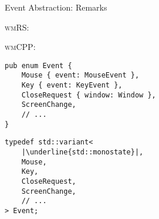 \begin{frame}[fragile]{Event Abstraction: Remarks \hfill {\footnotesize \currentname}}

\begin{minipage}[t]{.64\linewidth}
\textsc{wmRS}:\\[3pt]
\end{minipage}%
\begin{minipage}[t]{.36\linewidth}
\textsc{wmCPP}:\\[3pt]
\end{minipage}

\pause

\vspace*{8pt}\begin{minipage}[t]{.64\linewidth}
\begin{verbatim}
pub enum Event {
    Mouse { event: MouseEvent },
    Key { event: KeyEvent },
    CloseRequest { window: Window },
    ScreenChange,
    // ...
}
\end{verbatim}
\end{minipage}%
\begin{minipage}[t]{.36\linewidth}
\begin{verbatim}
typedef std::variant<
    |\underline{std::monostate}|,
    Mouse,
    Key,
    CloseRequest,
    ScreenChange,
    // ...
> Event;
\end{verbatim}
\end{minipage}

    \vfill

\end{frame}

